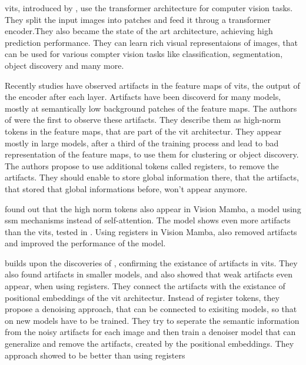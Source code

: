 \documentclass[conference]{IEEEtran}
\begin{document}
  \acfp{vit}, introduced by \cite{visiontransformers2021}, use the transformer architecture for computer vision tasks. They split the input images into patches and feed it throug a transformer encoder.They also became the state of the art architecture, achieving high prediction performance. They can learn rich visual representaions of images, that can be used for various compter vision tasks like classification, segmentation, object discovery and many more. \cite{visiontransformers2021} \cite{vit-state-challenges}

  Recently studies have observed artifacts in the feature maps of \acp{vit}, the output of the encoder after each layer. Artifacts have been discoverd for many models, mostly at semantically low background patches of the feature maps. \cite{registers} \cite{denoising} The authors of \cite{registers} were the first to observe these artifacts. They describe them as high-norm tokens in the feature maps, that are part of the \ac{vit} architectur. They appear mostly in large models, after a third of the training process and lead to bad representation of the feature maps, to use them for clustering or object discovery. The authors propose to use additional tokens called registers, to remove the artifacts. They should enable to store global information there, that the artifacts, that stored that global informations before, won't appear anymore.

  \cite{mamba-needs-registers} found out that the high norm tokens also appear in Vision Mamba, a model using \ac{ssm} mechanisms instead of self-attention. The model shows even more artifacts than the \acp{vit}, tested in \cite{registers}. Using registers in Vision Mamba, also removed artifacts and improved the performance of the model. \cite{mamba-needs-registers}

  \cite{denoising} builds upon the discoveries of \cite{registers}, confirming the existance of artifacts in \acp{vit}. They also found artifacts in smaller models, and also showed that weak artifacts even appear, when using registers. They connect the artifacts with the existance of positional embeddings of the \ac{vit} architectur. Instead of register tokens, they propose a denoising approach, that can be connected to exisiting models, so that on new models have to be trained. They try to seperate the semantic information from the noisy artifacts for each image and then train a denoiser model that can generalize and remove the artifacts, created by the positional embeddings. They approach showed to be better than using registers \cite{denoising}
\end{document}
